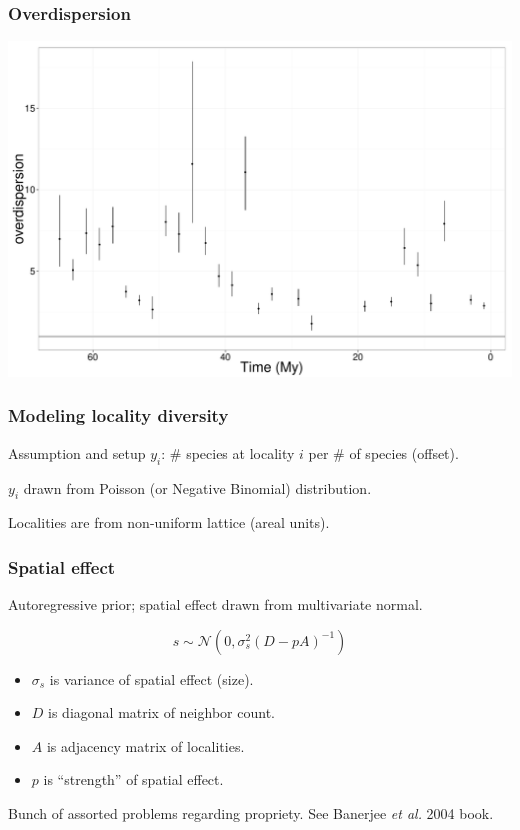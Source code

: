 \documentclass{beamer}
\begin{document}
\begin{frame}
  \frametitle{Overdispersion}
  \begin{center}
    \includegraphics[height = 0.8\textheight, width = \textwidth,  keepaspectratio = true]{figure/over_est_time}
  \end{center}
\end{frame}

\begin{frame}
  \frametitle{Modeling locality diversity}
  \begin{alertblock}{Assumption and setup}
    \(y_{i}\): \# species at locality \(i\) per \# of species (offset).

    \(y_{i}\) drawn from Poisson (or Negative Binomial) distribution.

    Localities are from non-uniform lattice (areal units).
  \end{alertblock}
\end{frame}

\begin{frame}
  \frametitle{Spatial effect}

  \begin{definition}
    Autoregressive prior; spatial effect drawn from multivariate normal.

    \begin{equation*}
      s \sim \mathcal{N}(0, \sigma_{s}^{2}(D - pA)^{-1})
    \end{equation*}

    \begin{itemize}
      \item \(\sigma_{s}\) is variance of spatial effect (size).
      \item \(D\) is diagonal matrix of neighbor count.
      \item \(A\) is adjacency matrix of localities.
      \item \(p\) is ``strength'' of spatial effect.
    \end{itemize}

    \tiny{Bunch of assorted problems regarding propriety. See Banerjee \textit{et al.} 2004 book.}

  \end{definition}
\end{frame}
\end{document}
